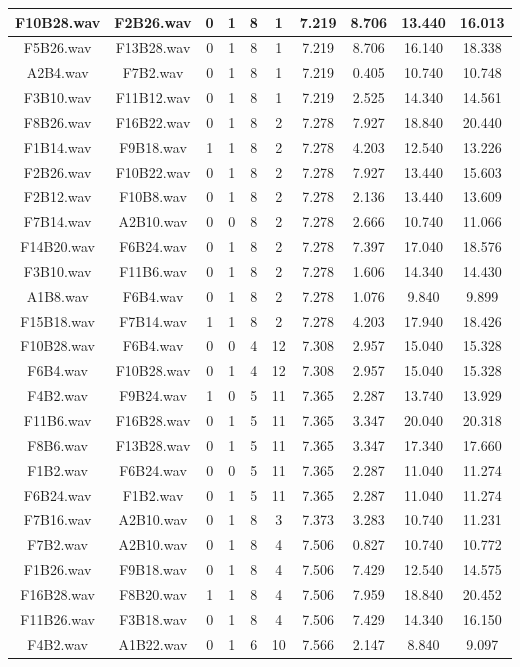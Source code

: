 \documentclass[11pt,a4paper]{book}
\begin{document}
\begin{longtable}[c]{|c|c|c|c|c|c|c|c|c|c|}
F10B28.wav&F2B26.wav&0&1&8&1&7.219&8.706&13.440&16.013\\ \hline
F5B26.wav&F13B28.wav&0&1&8&1&7.219&8.706&16.140&18.338\\ \hline
A2B4.wav&F7B2.wav&0&1&8&1&7.219&0.405&10.740&10.748\\ \hline
F3B10.wav&F11B12.wav&0&1&8&1&7.219&2.525&14.340&14.561\\ \hline
F8B26.wav&F16B22.wav&0&1&8&2&7.278&7.927&18.840&20.440\\ \hline
F1B14.wav&F9B18.wav&1&1&8&2&7.278&4.203&12.540&13.226\\ \hline
F2B26.wav&F10B22.wav&0&1&8&2&7.278&7.927&13.440&15.603\\ \hline
F2B12.wav&F10B8.wav&0&1&8&2&7.278&2.136&13.440&13.609\\ \hline
F7B14.wav&A2B10.wav&0&0&8&2&7.278&2.666&10.740&11.066\\ \hline
F14B20.wav&F6B24.wav&0&1&8&2&7.278&7.397&17.040&18.576\\ \hline
F3B10.wav&F11B6.wav&0&1&8&2&7.278&1.606&14.340&14.430\\ \hline
A1B8.wav&F6B4.wav&0&1&8&2&7.278&1.076&9.840&9.899\\ \hline
F15B18.wav&F7B14.wav&1&1&8&2&7.278&4.203&17.940&18.426\\ \hline
F10B28.wav&F6B4.wav&0&0&4&12&7.308&2.957&15.040&15.328\\ \hline
F6B4.wav&F10B28.wav&0&1&4&12&7.308&2.957&15.040&15.328\\ \hline
F4B2.wav&F9B24.wav&1&0&5&11&7.365&2.287&13.740&13.929\\ \hline
F11B6.wav&F16B28.wav&0&1&5&11&7.365&3.347&20.040&20.318\\ \hline
F8B6.wav&F13B28.wav&0&1&5&11&7.365&3.347&17.340&17.660\\ \hline
F1B2.wav&F6B24.wav&0&0&5&11&7.365&2.287&11.040&11.274\\ \hline
F6B24.wav&F1B2.wav&0&1&5&11&7.365&2.287&11.040&11.274\\ \hline
F7B16.wav&A2B10.wav&0&1&8&3&7.373&3.283&10.740&11.231\\ \hline
F7B2.wav&A2B10.wav&0&1&8&4&7.506&0.827&10.740&10.772\\ \hline
F1B26.wav&F9B18.wav&0&1&8&4&7.506&7.429&12.540&14.575\\ \hline
F16B28.wav&F8B20.wav&1&1&8&4&7.506&7.959&18.840&20.452\\ \hline
F11B26.wav&F3B18.wav&0&1&8&4&7.506&7.429&14.340&16.150\\ \hline
F4B2.wav&A1B22.wav&0&1&6&10&7.566&2.147&8.840&9.097\\ \hline

\end{longtable}
\end{document}
